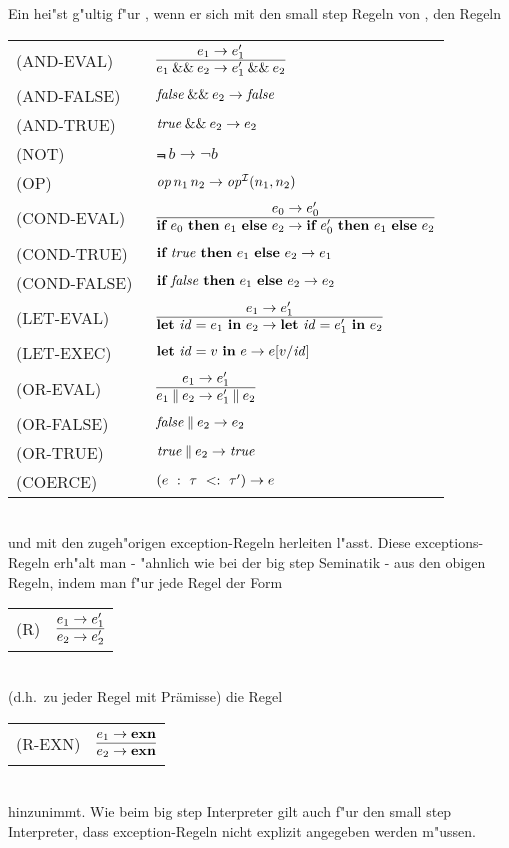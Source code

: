 Ein  hei"st g"ultig f"ur \LONE, wenn er sich mit den small step Regeln von \LZERO, den Regeln\\[5mm]
  \begin{tabular}{ll}
    \mbox{(AND-EVAL)}     & $\regel{e_1 \to e_1'}
                                 {\andalso{e_1}{e_2} \to \andalso{e_1'}{e_2}}$\\[5mm]
    \mbox{(AND-FALSE)}    & ${\text{\it false\/}}\mathbin{\&\&}e_2 \to {\text{\it false\/}}$\\[3mm]
    \mbox{(AND-TRUE)}     & ${\text{\it true\/}}\mathbin{\&\&}e_2 \to e_2$\\[3mm]
    \mbox{(NOT)}          & $\Not\,b \to \neg b$\\[3mm]
    \mbox{(OP)}           & ${\text{\it op\/}}\,n_1\,n_2 \to {\text{\it op\/}}^{{\cal I}}(n_1,n_2)$ \\[3mm]
    \mbox{(COND-EVAL)\ }  & $\regel{e_0 \to e'_0}
                            {\bifte{e_0}{e_1}{e_2} \to \bifte{e'_0}{e_1}{e_2}}$ \\[5mm]
    \mbox{(COND-TRUE)\ }  & $\textbf{if}\ {\text{\it true\/}}\ \textbf{then}\ e_1\ \textbf{else}\ e_2 \to e_1$ \\[3mm]
    \mbox{(COND-FALSE) }  & $\textbf{if}\ {\text{\it false\/}}\ \textbf{then}\ e_1\ \textbf{else}\ e_2 \to e_2$ \\[3mm]
    \mbox{(LET-EVAL)\  }  & $\regel{e_1 \to e'_1}
                            {\bli{\id}{e_1}{e_2} \to \bli{\id}{e'_1}{e_2}}$ \\[5mm]
    \mbox{(LET-EXEC)}       & $\textbf{let}\ {\text{\it id\/}} = v\ \textbf{in}\ e \to e[v/{\text{\it id\/}}]$ \\[5mm]
    \mbox{(OR-EVAL)}      & $\regel{e_1 \to e_1'}
                                   {\orelse{e_1}{e_2} \to \orelse{e_1'}{e_2}}$\\[5mm]
    \mbox{(OR-FALSE)}     & ${\text{\it false\/}}\mathbin{\|}e_2 \to e_2$\\[3mm]
    \mbox{(OR-TRUE)}      & ${\text{\it true\/}}\mathbin{\|}e_2 \to {\text{\it true\/}}$\\[3mm]
    \mbox{(COERCE)}       & $(e\ :\ \tau\ <:\ \tau') \to e$
  \end{tabular}\\[7mm]
und mit den zugeh"origen exception-Regeln herleiten l"asst. Diese exceptions-Regeln erh"alt man - "ahnlich wie
bei der big step Seminatik - aus den obigen Regeln, indem man f"ur jede Regel der Form\\[2mm]
  \begin{tabular}{ll}
    \mbox{(R)} & $\regel{e_1 \to e'_1}{e_2 \to e'_2}$
  \end{tabular}\\[3mm]
(d.h.\ zu jeder Regel mit Pr\"amisse) die Regel \\[3mm]
  \begin{tabular}{ll}
    \mbox{(R-EXN)} & $\regel{e_1 \to \exn}{e_2 \to \exn}$
  \end{tabular}\\[3mm]
hinzunimmt. Wie beim big step Interpreter gilt auch f"ur den small step Interpreter, dass exception-Regeln nicht
explizit angegeben werden m"ussen.


